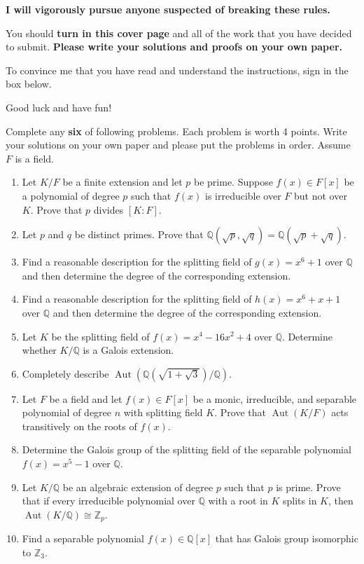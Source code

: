 \documentclass[11pt]{scrartcl}
\theoremstyle{definition}
\DeclareMathOperator{\Aut}{Aut}
\begin{document}
\begin{center}
\textbf{I will vigorously pursue anyone suspected of breaking these rules.}
\end{center}

\bigskip

You should \textbf{turn in this cover page} and all of the work that you have decided to submit. \textbf{Please write your solutions and proofs on your own paper.}

\bigskip

To convince me that you have read and understand the instructions, sign in the box below.

\bigskip


\bigskip

Good luck and have fun!

\newpage

Complete any \textbf{six} of following problems.  Each problem is worth 4 points. Write your solutions on your own paper and please put the problems in order. Assume $F$ is a field.

\begin{enumerate}
\item Let $K/F$ be a finite extension and let $p$ be prime. Suppose $f(x)\in F[x]$ be a polynomial of degree $p$ such that $f(x)$ is irreducible over $F$ but not over $K$. Prove that $p$ divides $[K:F]$.
\item Let $p$ and $q$ be distinct primes. Prove that $\mathbb{Q}(\sqrt{p},\sqrt{q})=\mathbb{Q}(\sqrt{p}+\sqrt{q})$.
\item Find a reasonable description for the splitting field of $g(x)=x^6+1$ over $\mathbb{Q}$ and then determine the degree of the corresponding extension.
\item Find a reasonable description for the splitting field of $h(x)=x^6+x+1$ over $\mathbb{Q}$ and then determine the degree of the corresponding extension.
\item Let $K$ be the splitting field of $f(x)=x^4-16x^2+4$ over $\mathbb{Q}$. Determine whether $K/\mathbb{Q}$ is a Galois extension.
\item Completely describe $\Aut(\mathbb{Q}(\sqrt{1+\sqrt{3}})/\mathbb{Q})$.
\item Let $F$ be a field and let $f(x)\in F[x]$ be a monic, irreducible, and separable polynomial of degree $n$ with splitting field $K$. Prove that $\Aut(K/F)$ acts transitively on the roots of $f(x)$.
\item Determine the Galois group of the splitting field of the separable polynomial $f(x)=x^5-1$ over $\mathbb{Q}$.
\item Let $K/\mathbb{Q}$ be an algebraic extension of degree $p$ such that $p$ is prime. Prove that if every irreducible polynomial over $\mathbb{Q}$ with a root in $K$ splits in $K$, then $\Aut(K/\mathbb{Q})\cong \mathbb{Z}_p$.
\item Find a separable polynomial $f(x)\in \mathbb{Q}[x]$ that has Galois group isomorphic to $\mathbb{Z}_3$.
\end{enumerate}
\end{document}
